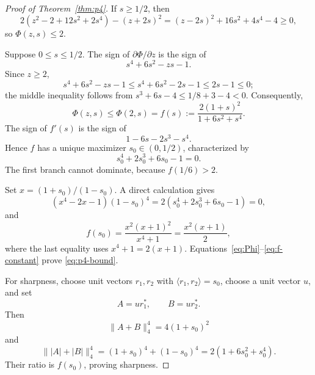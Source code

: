 \documentclass[10pt,a4paper]{amsart}
\begin{document}
\begin{proof}[Proof of Theorem~\ref{thm:p4}]
If \(s\ge1/2\), then
\[
 2(z^2-2+12s^2+2s^4)-(z+2s)^2
 =
 (z-2s)^2+16s^2+4s^4-4\ge0,
\]
so \(\Phi(z,s)\le2\).

Suppose \(0\le s\le1/2\).  The sign of
\(\partial\Phi/\partial z\) is the sign of
\[
 s^4+6s^2-zs-1.
\]
Since \(z\ge2\),
\[
 s^4+6s^2-zs-1
 \le s^4+6s^2-2s-1
 \le2s-1\le0;
\]
the middle inequality follows from
\(s^3+6s-4\le1/8+3-4<0\).
Consequently,
\begin{equation}\label{eq:f-s}
 \Phi(z,s)\le\Phi(2,s)
 =
 f(s):=\frac{2(1+s)^2}{1+6s^2+s^4}.
\end{equation}
The sign of \(f'(s)\) is the sign of
\[
 1-6s-2s^3-s^4.
\]
Hence \(f\) has a unique maximizer \(s_0\in(0,1/2)\), characterized by
\begin{equation}\label{eq:s0}
 s_0^4+2s_0^3+6s_0-1=0.
\end{equation}
The first branch cannot dominate, because \(f(1/6)>2\).

Set \(x=(1+s_0)/(1-s_0)\).  A direct calculation gives
\[
 (x^4-2x-1)(1-s_0)^4
 =
 2(s_0^4+2s_0^3+6s_0-1)=0,
\]
and
\begin{equation}\label{eq:f-constant}
 f(s_0)
 =
 \frac{x^2(x+1)^2}{x^4+1}
 =
 \frac{x^2(x+1)}2,
\end{equation}
where the last equality uses \(x^4+1=2(x+1)\).
Equations~\eqref{eq:Phi}--\eqref{eq:f-constant} prove
\eqref{eq:p4-bound}.

For sharpness, choose unit vectors \(r_1,r_2\) with
\(\langle r_1,r_2\rangle=s_0\), choose a unit vector \(u\), and set
\[
 A=ur_1^*,\qquad B=ur_2^*.
\]
Then
\[
 \|A+B\|_4^4=4(1+s_0)^2
\]
and
\[
 \||A|+|B|\|_4^4
 =(1+s_0)^4+(1-s_0)^4
 =2(1+6s_0^2+s_0^4).
\]
Their ratio is \(f(s_0)\), proving sharpness.
\end{proof}
\end{document}
